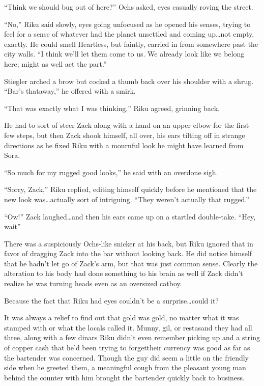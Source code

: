 ``Think we should bug out of here?'' Ochs asked, eyes casually roving the street.

``No,'' Riku said slowly, eyes going unfocused as he opened his senses, trying to feel for a sense of whatever had the planet unsettled and coming up\ldots not empty, exactly. He could smell Heartless, but faintly, carried in from somewhere past the city walls. ``I think we'll let them come to us. We already look like we belong here; might as well act the part.''

Stiegler arched a brow but cocked a thumb back over his shoulder with a shrug. ``Bar's thataway,'' he offered with a smirk.

``That was exactly what I was thinking,'' Riku agreed, grinning back.

He had to sort of steer Zack along with a hand on an upper elbow for the first few steps, but then Zack shook himself, all over, his ears tilting off in strange directions as he fixed Riku with a mournful look he might have learned from Sora.

``So much for my rugged good looks,'' he said with an overdone sigh.

``Sorry, Zack,'' Riku replied, editing himself quickly before he mentioned that the new look was\ldots actually sort of intriguing. ``They weren't actually that rugged.''

``Ow!'' Zack laughed\ldots and then his ears came up on a startled double-take. ``Hey, wait\textemdash''

There was a suspiciously Ochs-like snicker at his back, but Riku ignored that in favor of dragging Zack into the bar without looking back. He did notice himself that he hadn't let go of Zack's arm, but that was just common sense. Clearly the alteration to his body had done something to his brain as well if Zack didn't realize he was turning heads even as an oversized catboy.

Because the fact that Riku had eyes couldn't be a surprise\ldots could it?

It was always a relief to find out that gold was gold, no matter what it was stamped with or what the locals called it. Munny, gil, or restas\textemdash and they had all three, along with a few dinars Riku didn't even remember picking up and a string of copper cash that he'd been trying to forget\textemdash their currency was good as far as the bartender was concerned. Though the guy did seem a little on the friendly side when he greeted them, a meaningful cough from the pleasant young man behind the counter with him brought the bartender quickly back to business.

